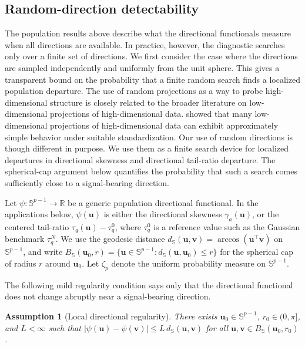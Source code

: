 \documentclass[11pt]{article}
\theoremstyle{plain}
\newtheorem{assumption}{Assumption}
\theoremstyle{definition}
\theoremstyle{remark}
\def\u{\bm{u}}
\newcommand{\abs}[1]{\left\lvert #1 \right\rvert}
\begin{document}
\subsection{Random-direction detectability}
\label{subsec:random-direction-detectability}

The population results above describe what the directional functionals measure when all directions are available. In practice, however, the diagnostic searches only over a finite set of directions. We first consider the case where the directions are sampled independently and uniformly from the unit sphere. This gives a transparent bound on the probability that a finite random search finds a localized population departure. The use of random projections as a way to probe high-dimensional structure is closely related to the broader literature on low-dimensional projections of high-dimensional data. \citet{hall1993almost} showed that many low-dimensional projections of high-dimensional data can exhibit approximately simple behavior under suitable standardization. Our use of random directions is though different in purpose. We use them as a finite search device for localized departures in directional skewness and directional tail-ratio departure. The spherical-cap argument below quantifies the probability that such a search comes sufficiently close to a signal-bearing direction.

Let \(\psi:\mathbb{S}^{p-1}\to\mathbb R\) be a generic population directional functional. In the applications below, \(\psi(\u)\) is either the directional skewness \(\gamma_a(\u)\), or the centered tail-ratio \(\tau_q(\u)-\tau_q^0\), where \(\tau_q^0\) is a reference value such as the Gaussian benchmark \(\tau_q^N\). We use the geodesic distance \(d_{\mathbb S}(\u,\bm{v})=\arccos(\u^\top \bm{v})\) on \(\mathbb{S}^{p-1}\), and write \(B_{\mathbb S}(\u_0,r)=\{\u\in \mathbb{S}^{p-1}:d_{\mathbb S}(\u,\u_0)\leqslant r\}\) for the spherical cap of radius \(r\) around \(\u_0\). Let \(\zeta_p \) denote the uniform probability measure on \(\mathbb{S}^{p-1}\). 

The following mild regularity condition says only that the directional functional does not change abruptly near a signal-bearing direction.

\begin{assumption}[Local directional regularity]
	\label{ass:lipschitz_directional}
	There exists \(\u_0\in \mathbb{S}^{p-1}\), \(r_0\in(0,\pi]\), and \(L<\infty\) such that \(\abs{\psi(\u)-\psi(\bm v)} \leqslant L\,d_{\mathbb S}(\u,\bm v)\) for all \(\u,\bm v\in B_{\mathbb S}(\u_0,r_0)\). 
\end{assumption}
\end{document}
